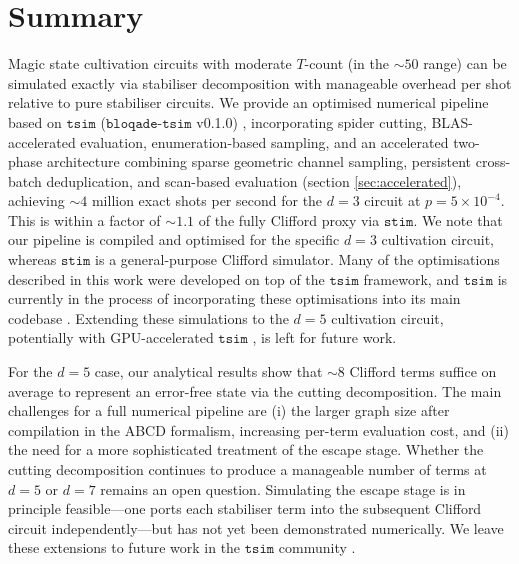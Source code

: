 \documentclass[a4paper,onecolumn,11pt,accepted=2026-06-10]{quantumarticle}
\begin{document}
\section{Summary}
Magic state cultivation circuits with moderate $T$-count (in the $\sim 50$ range) can be simulated exactly via stabiliser decomposition with manageable overhead per shot relative to pure stabiliser circuits. We provide an optimised numerical pipeline based on $\mathtt{tsim}$ ($\mathtt{bloqade\text{-}tsim}$ v0.1.0) \cite{QuEraComputing_tsim_2026}, incorporating spider cutting, BLAS-accelerated evaluation, enumeration-based sampling, and an accelerated two-phase architecture combining sparse geometric channel sampling, persistent cross-batch deduplication, and scan-based evaluation (section \ref{sec:accelerated}), achieving ${\sim}4$ million exact shots per second for the $d{=}3$ circuit at $p = 5 \times 10^{-4}$. This is within a factor of ${\sim}1.1$ of the fully Clifford proxy via $\mathtt{stim}$. We note that our pipeline is compiled and optimised for the specific $d{=}3$ cultivation circuit, whereas $\mathtt{stim}$ is a general-purpose Clifford simulator. Many of the optimisations described in this work were developed on top of the $\mathtt{tsim}$ framework, and $\mathtt{tsim}$ is currently in the process of incorporating these optimisations into its main codebase \cite{haenel2026tsimfastuniversalsimulator}. Extending these simulations to the $d=5$ cultivation circuit, potentially with GPU-accelerated $\mathtt{tsim}$ \cite{haenel2026tsimfastuniversalsimulator,QuEraComputing_tsim_2026}, is left for future work.

For the $d=5$ case, our analytical results show that $\sim 8$ Clifford terms suffice on average to represent an error-free state via the cutting decomposition. The main challenges for a full numerical pipeline are (i) the larger graph size after compilation in the ABCD formalism, increasing per-term evaluation cost, and (ii) the need for a more sophisticated treatment of the escape stage. Whether the cutting decomposition continues to produce a manageable number of terms at $d=5$ or $d=7$ remains an open question. Simulating the escape stage is in principle feasible---one ports each stabiliser term into the subsequent Clifford circuit independently---but has not yet been demonstrated numerically. We leave these extensions to future work in the $\mathtt{tsim}$ community \cite{QuEraComputing_tsim_2026, haenel2026tsimfastuniversalsimulator}.
\end{document}

